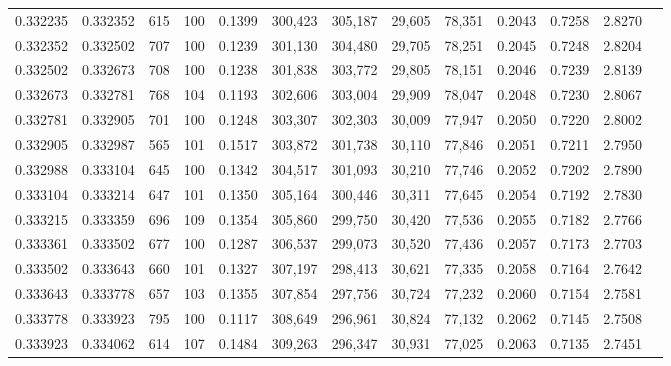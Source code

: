 \begin{tabular}{rrrrrrrrrrrrr}
0.332235 & 0.332352 &   615 & 100 &                                     0.1399 & 300,423 & 305,187 &  29,605 &  78,351 & 0.2043 & 0.7258 & 2.8270 \\
0.332352 & 0.332502 &   707 & 100 &                                     0.1239 & 301,130 & 304,480 &  29,705 &  78,251 & 0.2045 & 0.7248 & 2.8204 \\
0.332502 & 0.332673 &   708 & 100 &                                     0.1238 & 301,838 & 303,772 &  29,805 &  78,151 & 0.2046 & 0.7239 & 2.8139 \\
0.332673 & 0.332781 &   768 & 104 &                                     0.1193 & 302,606 & 303,004 &  29,909 &  78,047 & 0.2048 & 0.7230 & 2.8067 \\
0.332781 & 0.332905 &   701 & 100 &                                     0.1248 & 303,307 & 302,303 &  30,009 &  77,947 & 0.2050 & 0.7220 & 2.8002 \\
0.332905 & 0.332987 &   565 & 101 &                                     0.1517 & 303,872 & 301,738 &  30,110 &  77,846 & 0.2051 & 0.7211 & 2.7950 \\
0.332988 & 0.333104 &   645 & 100 &                                     0.1342 & 304,517 & 301,093 &  30,210 &  77,746 & 0.2052 & 0.7202 & 2.7890 \\
0.333104 & 0.333214 &   647 & 101 &                                     0.1350 & 305,164 & 300,446 &  30,311 &  77,645 & 0.2054 & 0.7192 & 2.7830 \\
0.333215 & 0.333359 &   696 & 109 &                                     0.1354 & 305,860 & 299,750 &  30,420 &  77,536 & 0.2055 & 0.7182 & 2.7766 \\
0.333361 & 0.333502 &   677 & 100 &                                     0.1287 & 306,537 & 299,073 &  30,520 &  77,436 & 0.2057 & 0.7173 & 2.7703 \\
0.333502 & 0.333643 &   660 & 101 &                                     0.1327 & 307,197 & 298,413 &  30,621 &  77,335 & 0.2058 & 0.7164 & 2.7642 \\
0.333643 & 0.333778 &   657 & 103 &                                     0.1355 & 307,854 & 297,756 &  30,724 &  77,232 & 0.2060 & 0.7154 & 2.7581 \\
0.333778 & 0.333923 &   795 & 100 &                                     0.1117 & 308,649 & 296,961 &  30,824 &  77,132 & 0.2062 & 0.7145 & 2.7508 \\
0.333923 & 0.334062 &   614 & 107 &                                     0.1484 & 309,263 & 296,347 &  30,931 &  77,025 & 0.2063 & 0.7135 & 2.7451 \\

\end{tabular}
